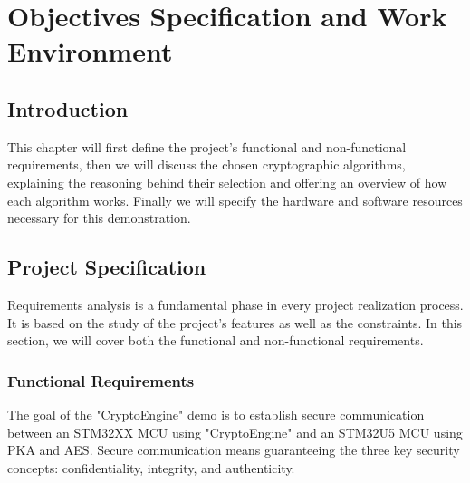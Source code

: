 \chapter{Objectives Specification and Work Environment}

\section*{Introduction}
This chapter will first define the project's functional and non-functional requirements, then we will discuss the chosen cryptographic algorithms, explaining the reasoning behind their selection and offering an overview of how each algorithm works. Finally we will specify the hardware and software resources necessary for this demonstration. 

\section{Project Specification}
Requirements analysis is a fundamental phase in every project realization process. It is based on the study of the project's features as well as the constraints. In this section, we will cover both the functional and non-functional requirements.

\subsection{Functional Requirements}

The goal of the "CryptoEngine" demo is to establish secure communication between an STM32XX MCU using "CryptoEngine" and an STM32U5 MCU using PKA and AES. Secure communication means guaranteeing the three key security concepts: confidentiality, integrity, and authenticity.

